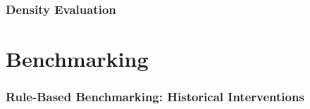 \documentclass{beamer}
\begin{document}
\begin{frame}
  \frametitle{Density Evaluation}
\end{frame}


\section{Benchmarking}


\begin{frame}
  \frametitle{Rule-Based Benchmarking: Historical Interventions}
\end{frame}
\end{document}
